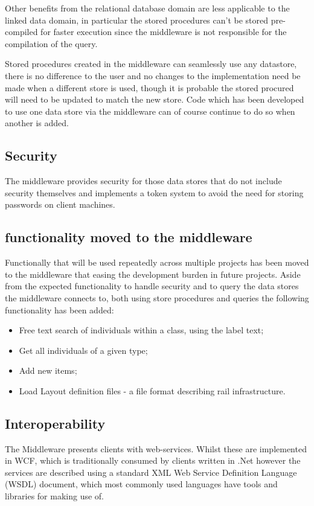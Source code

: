 Other benefits from the relational database domain are less applicable to the linked data domain, in particular the stored procedures can't be stored pre-compiled for faster execution since the middleware is not responsible for the compilation of the query.

 Stored procedures created in the middleware can seamlessly use any datastore, there is no difference to the user and no changes to the implementation need be made when a different store is used, though it is probable the stored procured will need to be updated to match the new store. Code which has been developed to use one data store via the middleware can of course continue to do so when another is added. 

\subsection{Security}
The middleware provides security for those data stores that do not include security themselves and implements a token system to avoid the need for storing passwords on client machines.

\subsection{functionality moved to the middleware}\label{midfunc}
Functionally that will be used repeatedly across multiple projects has been moved to the middleware that easing the development burden in future projects. Aside from the expected functionality to handle security and to query the data stores the middleware connects to, both using store procedures and queries the following functionality has been added:
\begin{itemize}
    \item Free text search of individuals within a class, using the label text;
    \item Get all individuals of a given type;
    \item Add new items;
    \item Load Layout definition files - a file format describing rail infrastructure.
\end{itemize}

\subsection{Interoperability}

The Middleware presents clients with web-services. Whilst these are implemented in WCF, which is traditionally consumed by clients written in .Net however the services are described using a standard XML Web Service Definition Language (WSDL) document, which most commonly used languages have tools and libraries for making use of. 

